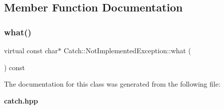 \subsection{Member Function Documentation}
\mbox{\label{class_catch_1_1_not_implemented_exception_ad4c13963f1a8feacda0cd331adda89e3}} 
\subsubsection{what()}
{\footnotesize\ttfamily virtual const char$\ast$ Catch\+::\+Not\+Implemented\+Exception\+::what (\begin{DoxyParamCaption}{ }\end{DoxyParamCaption}) const\hspace{0.3cm}{\ttfamily [virtual]}}



The documentation for this class was generated from the following file\+:\begin{DoxyCompactItemize}
\item 
\textbf{ catch.\+hpp}\end{DoxyCompactItemize}
